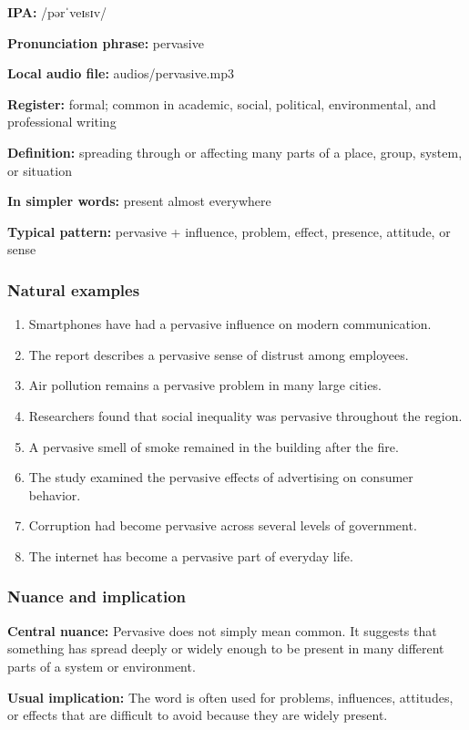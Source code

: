 \documentclass[11pt]{article}
\begin{document}
\textbf{IPA:} /pərˈveɪsɪv/

\textbf{Pronunciation phrase:} pervasive

\textbf{Local audio file:} audios/pervasive.mp3

\textbf{Register:} formal; common in academic, social, political, environmental, and professional writing

\textbf{Definition:} spreading through or affecting many parts of a place, group, system, or situation

\textbf{In simpler words:} present almost everywhere

\textbf{Typical pattern:} pervasive + influence, problem, effect, presence, attitude, or sense

\subsubsection{Natural examples}
\begin{enumerate}
  \item Smartphones have had a pervasive influence on modern communication.
  \item The report describes a pervasive sense of distrust among employees.
  \item Air pollution remains a pervasive problem in many large cities.
  \item Researchers found that social inequality was pervasive throughout the region.
  \item A pervasive smell of smoke remained in the building after the fire.
  \item The study examined the pervasive effects of advertising on consumer behavior.
  \item Corruption had become pervasive across several levels of government.
  \item The internet has become a pervasive part of everyday life.
\end{enumerate}

\subsubsection{Nuance and implication}
\textbf{Central nuance:} Pervasive does not simply mean common. It suggests that something has spread deeply or widely enough to be present in many different parts of a system or environment.

\textbf{Usual implication:} The word is often used for problems, influences, attitudes, or effects that are difficult to avoid because they are widely present.
\end{document}
